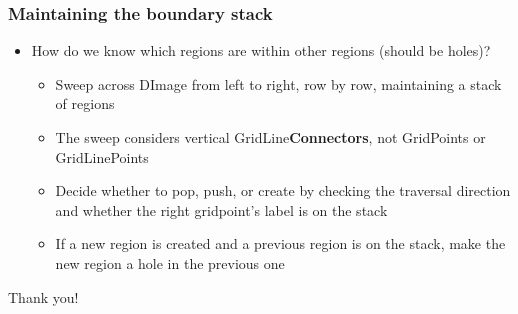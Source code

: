 \documentclass{beamer}
\begin{document}
\begin{frame}
    \frametitle{Maintaining the boundary stack}
    \begin{itemize}
        \item How do we know which regions are within other regions (should be holes)?
            \begin{itemize}
                \item Sweep across DImage from left to right, row by row, maintaining a stack of regions
                \item The sweep considers vertical GridLine\textbf{Connectors}, not GridPoints or GridLinePoints
                \item Decide whether to pop, push, or create by checking the traversal direction and whether the right gridpoint's label is on the stack
                \item If a new region is created and a previous region is on the stack, make the new region a hole in the previous one
            \end{itemize}
    \end{itemize}
\end{frame}

\begin{frame}[plain,c]
    \begin{center}
        \Huge Thank you! 
    \end{center}
\end{frame}
\end{document}
